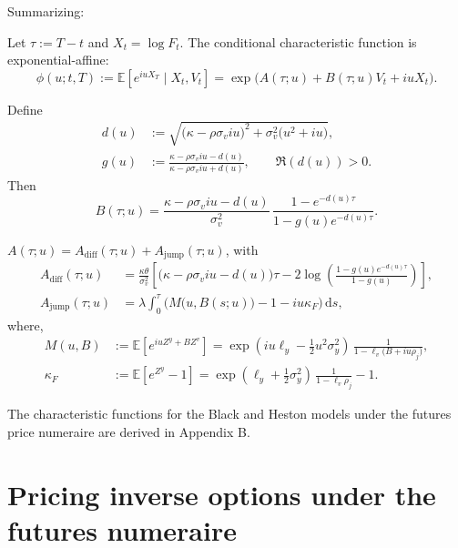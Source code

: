 \documentclass[a4paper,titlepage,12pt]{report}
\theoremstyle{plain}
\begin{document}
Summarizing:
\begin{tcolorbox}[title={Characteristic function (SVCJ under the futures numeraire)},
colback=gray!3,colframe=black!30,boxrule=0.4pt,arc=2mm,
left=1em,right=1em,top=0.8em,bottom=0.8em,fonttitle=\bfseries]

Let $\tau:=T-t$ and $X_t=\log F_t$. The conditional characteristic function is exponential-affine:
\begin{equation}
\phi(u;t,T):=\mathbb{E}\!\left[e^{iuX_T}\mid X_t,V_t\right]
=
\exp\!\big(A(\tau;u)+B(\tau;u)V_t+iuX_t\big).
\end{equation}

Define
\begin{align*}
d(u) &:= \sqrt{\big(\kappa-\rho\sigma_v iu\big)^2+\sigma_v^2\big(u^2+iu\big)},\\
g(u) &:= \frac{\kappa-\rho\sigma_v iu-d(u)}{\kappa-\rho\sigma_v iu+d(u)},
\qquad \Re(d(u))>0.
\end{align*}
Then
\begin{equation}
B(\tau;u)
=
\frac{\kappa-\rho\sigma_v iu-d(u)}{\sigma_v^2}\,
\frac{1-e^{-d(u)\tau}}{1-g(u)e^{-d(u)\tau}}.
\end{equation}

$A(\tau;u)=A_{\mathrm{diff}}(\tau;u)+A_{\mathrm{jump}}(\tau;u)$, with
\begin{align}
A_{\mathrm{diff}}(\tau;u)
&=
\frac{\kappa\theta}{\sigma_v^2}
\left[
\big(\kappa-\rho\sigma_v iu-d(u)\big)\tau
-2\log\!\left(\frac{1-g(u)e^{-d(u)\tau}}{1-g(u)}\right)
\right],
\label{eq:cf_Adiff_box}\\[4pt]
A_{\mathrm{jump}}(\tau;u)
&=
\lambda\int_0^\tau\Big(M\!\big(u,B(s;u)\big)-1-iu\kappa_F\Big)\,\mathrm{d}s,
\label{eq:cf_Ajump_box}
\end{align}
where,
\begin{align}
M(u,B)
&:=\mathbb{E}\!\left[e^{iuZ^y+BZ^v}\right]
=
\exp\!\left(iu\ell_y-\frac12u^2\sigma_y^2\right)\,
\frac{1}{1-\ell_v\big(B+iu\rho_j\big)},
\label{eq:M_box_closed}\\[4pt]
\kappa_F
&:=\mathbb{E}\!\left[e^{Z^y}-1\right]
=
\exp\!\left(\ell_y+\frac12\sigma_y^2\right)\,
\frac{1}{1-\ell_v\rho_j}
-1.
\label{eq:kappaF_box_closed}
\end{align}

\end{tcolorbox}

The characteristic functions for the Black and Heston models under the futures price numeraire are derived in Appendix B.


\section{Pricing inverse options under the futures numeraire}
\label{sec:pricing_inverse}
\end{document}
